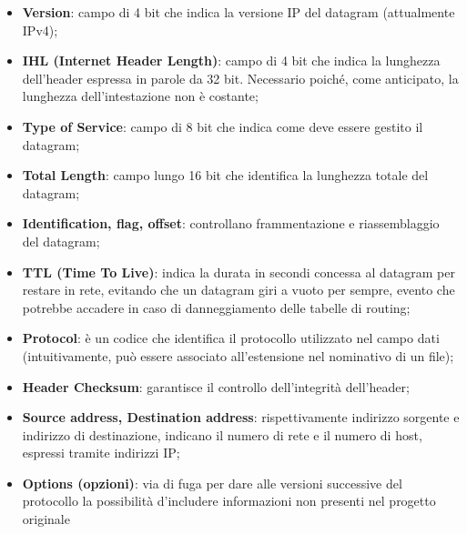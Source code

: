             \begin{itemize}
                \item \textbf{Version}: campo di 4 bit che indica la versione IP del datagram (attualmente IPv4);

                \item \textbf{IHL (Internet Header Length)}: campo di 4 bit che indica la lunghezza dell’header
                    espressa in parole da 32 bit. Necessario poiché, come anticipato, la lunghezza
                    dell’intestazione non è costante;

                \item \textbf{Type of Service}: campo di 8 bit che indica come deve essere gestito il datagram;

                \item \textbf{Total Length}: campo lungo 16 bit che identifica la lunghezza totale del datagram;

                \item \textbf{Identification, flag, offset}: controllano frammentazione e riassemblaggio del datagram;

                \item \textbf{TTL (Time To Live)}: indica la durata in secondi concessa al datagram per restare in rete,
                    evitando che un datagram giri a vuoto per sempre, evento che potrebbe accadere in caso
                    di danneggiamento delle tabelle di routing;

                \item \textbf{Protocol}: è un codice che identifica il protocollo utilizzato nel campo dati
                    (intuitivamente, può essere associato all’estensione nel nominativo di un file);

                \item \textbf{Header Checksum}: garantisce il controllo dell’integrità dell’header;

                \item \textbf{Source address, Destination address}: rispettivamente indirizzo sorgente e indirizzo di
                    destinazione, indicano il numero di rete e il numero di host, espressi tramite indirizzi IP;

                \item \textbf{Options (opzioni)}: via di fuga per dare alle versioni successive del protocollo la
                    possibilità d’includere informazioni non presenti nel progetto originale
            \end{itemize}
            
